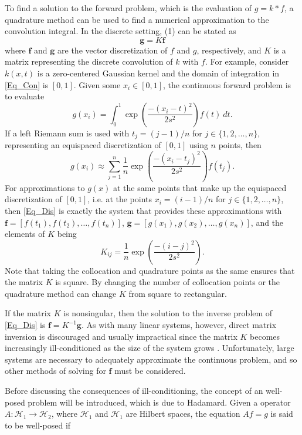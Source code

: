 \documentclass[12pt]{article}
\newcommand{\gcon}{g}
\newcommand{\kcon}{k}
\newcommand{\fcon}{f}
\newcommand{\gdis}{\mathbf{g}}
\newcommand{\kmat}{K}	%
\newcommand{\fdis}{\mathbf{f}}
\newcommand{\SD}{s}	%
\begin{document}
To find a solution to the forward problem, which is the evaluation of $\gcon = \kcon * \fcon$, a quadrature method can be used to find a numerical approximation to the convolution integral. In the discrete setting, (1) can be stated as
\begin{equation}
\gdis = \kmat\fdis
\label{Eq_Dis}
\end{equation}
where $\fdis$ and $\gdis$ are the vector discretization of $\fcon$ and $\gcon$, respectively, and $\kmat$ is a matrix representing the discrete convolution of $\kcon$ with $\fcon$. For example, consider $\kcon(x,t)$ is a zero-centered Gaussian kernel and the domain of integration in \eqref{Eq_Con} is $[0,1]$. Given some $x_i \in [0,1]$, the continuous forward problem is to evaluate
\[g(x_i) = \int_0^1 \exp\left(\frac{-(x_i - t)^2}{2\SD^2}\right)\fcon(t) \: dt.\]
If a left Riemann sum is used with $t_j = (j-1)/n$ for $j \in \{1,2,\ldots,n\}$, representing an equispaced discretization of $[0,1]$ using $n$ points, then
\[g(x_i) \approx \sum_{j=1}^n \frac{1}{n}\exp\left(\frac{-(x_i - t_j)^2}{2\SD^2}\right)\fcon(t_j).\]
For approximations to $\gcon(x)$ at the same points that make up the equispaced discretization of $[0,1]$, i.e. at the points $x_i = (i-1)/n$ for $j \in \{1,2,\ldots,n\}$, then \eqref{Eq_Dis} is exactly the system that provides these approximations with $\fdis = [\fcon(t_1),\fcon(t_2),\ldots,\fcon(t_n)]$, $\gdis = [\gcon(x_1),\gcon(x_2),\ldots,\gcon(x_n)]$, and the elements of $\kmat$ being
\[K_{ij} = \frac{1}{n}\exp\left(\frac{-(i - j)^2}{2\SD^2}\right).\]
Note that taking the collocation and quadrature points as the same ensures that the matrix $\kmat$ is square. By changing the number of collocation points or the quadrature method can change $\kmat$ from square to rectangular. \par
If the matrix $\kmat$ is nonsingular, then the solution to the inverse problem of \eqref{Eq_Dis} is $\fdis = \kmat^{-1}\gdis$. As with many linear systems, however, direct matrix inversion is discouraged and usually impractical since the matrix $\kmat$ becomes increasingly ill-conditioned as the size of the system grows \cite{Vogel:2002}. Unfortunately, large systems are necessary to adequately approximate the continuous problem, and so other methods of solving for $\fdis$ must be considered. \par
Before discussing the consequences of ill-conditioning, the concept of an well-posed problem will be introduced, which is due to Hadamard. Given a operator $A : \mathcal{H}_1 \rightarrow \mathcal{H}_2$, where $\mathcal{H}_1$ and $\mathcal{H}_1$ are Hilbert spaces, the equation $Af = g$ is said to be well-posed if
\end{document}
